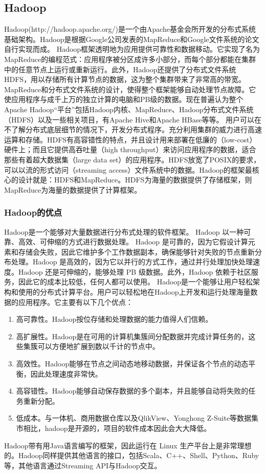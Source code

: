   \subsection{Hadoop}
  Hadoop(http://hadoop.apache.org/)是一个由Apache基金会所开发的分布式系统基础架构。Hadoop是根据Google公司发表的MapReduce和Google文件系统的论文自行实现而成。
  Hadoop框架透明地为应用提供可靠性和数据移动。它实现了名为MapReduce的编程范式：应用程序被分区成许多小部分，而每个部分都能在集群中的任意节点上运行或重新运行。此外，Hadoop还提供了分布式文件系统\gls*{HDFS}，用以存储所有计算节点的数据，这为整个集群带来了非常高的带宽。MapReduce和分布式文件系统的设计，使得整个框架能够自动处理节点故障。它使应用程序与成千上万的独立计算的电脑和PB级的数据。现在普遍认为整个Apache Hadoop“平台”包括Hadoop内核、MapReduce、Hadoop分布式文件系统（HDFS）以及一些相关项目，有Apache Hive和Apache HBase等等。
  用户可以在不了解分布式底层细节的情况下，开发分布式程序。充分利用集群的威力进行高速运算和存储。HDFS有高容错性的特点，并且设计用来部署在低廉的（low-cost）硬件上；而且它提供高吞吐量（high throughput）来访问应用程序的数据，适合那些有着超大数据集（large data set）的应用程序。HDFS放宽了POSIX的要求，可以以流的形式访问（streaming access）文件系统中的数据。Hadoop的框架最核心的设计就是：HDFS和MapReduce。HDFS为海量的数据提供了存储框架，则MapReduce为海量的数据提供了计算框架。

    \subsubsection{Hadoop的优点}
    Hadoop是一个能够对大量数据进行分布式处理的软件框架。 Hadoop 以一种可靠、高效、可伸缩的方式进行数据处理。
    Hadoop 是可靠的，因为它假设计算元素和存储会失败，因此它维护多个工作数据副本，确保能够针对失败的节点重新分布处理。Hadoop 是高效的，因为它以并行的方式工作，通过并行处理加快处理速度。Hadoop 还是可伸缩的，能够处理 PB 级数据。此外，Hadoop 依赖于社区服务，因此它的成本比较低，任何人都可以使用。
    Hadoop是一个能够让用户轻松架构和使用的分布式计算平台。用户可以轻松地在Hadoop上开发和运行处理海量数据的应用程序。它主要有以下几个优点：
    \begin{enumerate}
    \item 高可靠性。Hadoop按位存储和处理数据的能力值得人们信赖。
    \item 高扩展性。Hadoop是在可用的计算机集簇间分配数据并完成计算任务的，这些集簇可以方便地扩展到数以千计的节点中。
    \item 高效性。Hadoop能够在节点之间动态地移动数据，并保证各个节点的动态平衡，因此处理速度非常快。
    \item 高容错性。Hadoop能够自动保存数据的多个副本，并且能够自动将失败的任务重新分配。
    \item 低成本。与一体机、商用数据仓库以及QlikView、Yonghong Z-Suite等数据集市相比，hadoop是开源的，项目的软件成本因此会大大降低。
    \end{enumerate}
    Hadoop带有用Java语言编写的框架，因此运行在 Linux 生产平台上是非常理想的。Hadoop同样提供其他语言的接口，包括Scala、C++、Shell、Python、Ruby等，其他语言通过Streaming API与Hadoop交互。
